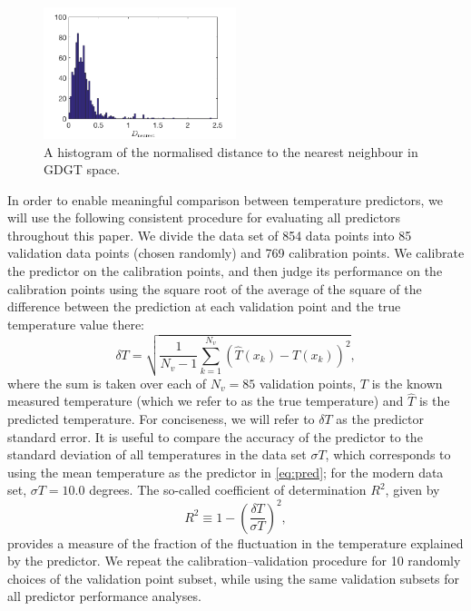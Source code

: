 \documentclass[rmp,aps,twocolumn]{revtex4-1}
\def\be{\begin{equation}}
\def\ee{\end{equation}}
\begin{document}
\begin{figure}
	\centering
	\includegraphics[width=0.5\textwidth]{nearest.png}
	\caption{\label{fig:nearest}  A histogram of the normalised distance to the nearest neighbour in GDGT space.}
\end{figure}

In order to enable meaningful comparison between temperature predictors, we will use the following consistent procedure for evaluating all predictors throughout this paper.  We divide the data set of 854 data points into 85 validation data points (chosen randomly) and 769 calibration points.  We calibrate the predictor on the calibration points, and then judge its performance on the calibration points using the square root of the average of the square of the difference between the prediction at each validation point and the true temperature value there:
\be\label{eq:pred}
\delta T = \sqrt{\frac{1}{N_v-1}\sum_{k=1}^{N_v} (\hat{T} (x_k) - T(x_k))^2},
\ee
where the sum is taken over each of $N_v=85$ validation points, $T$ is the known measured temperature (which we refer to as the true temperature) and $\hat{T}$ is the predicted temperature.  For conciseness, we will refer to $\delta T$ as the predictor standard error.  It is useful to compare the accuracy of the predictor to the standard deviation of all temperatures in the data set $\sigma T$, which corresponds to using the mean temperature as the predictor in \autoref{eq:pred}; for the modern data set, $\sigma T = 10.0$ degrees.  The so-called coefficient of determination $R^2$, given by 
\be
R^2 \equiv 1 - \left(\frac{\delta T}{\sigma T}\right)^2,
\ee
provides a measure of the fraction of the fluctuation in the temperature explained by the predictor.  We repeat the calibration--validation procedure for 10 randomly choices of the validation point subset, while using the same validation subsets for all predictor performance analyses.
\end{document}
